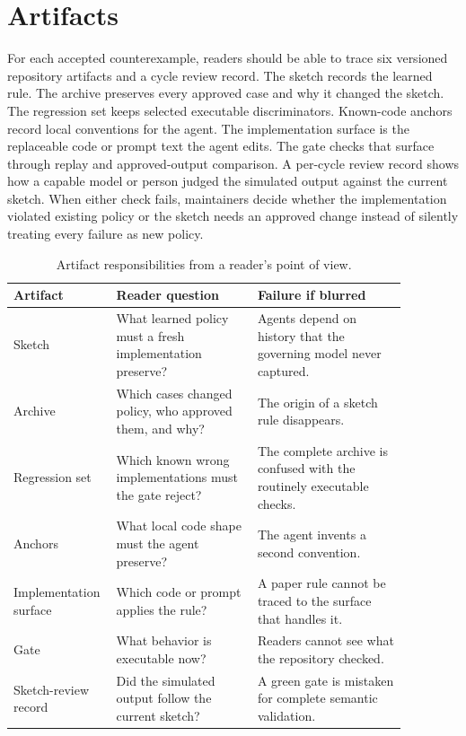 \documentclass[11pt]{article}
\begin{document}
\section{Artifacts}
\label{sec:artifacts}

For each accepted counterexample, readers should be able to trace six versioned repository
artifacts and a cycle review record.  The sketch records the learned rule.  The archive preserves every approved case and why it changed
the sketch.  The regression set keeps selected executable discriminators.  Known-code anchors
record local conventions for the agent.  The implementation surface is the replaceable code or
prompt text the agent edits.  The gate checks that surface through replay and approved-output
comparison.  A per-cycle review record shows how a capable model or person judged the simulated
output against the current sketch.
When either check fails, maintainers decide whether the implementation violated existing policy
or the sketch needs an approved change instead of silently treating every failure as new policy.

\begin{table}[t]
\begin{center}
\small
\begin{tabular}{p{0.17\linewidth}p{0.34\linewidth}p{0.36\linewidth}}
\toprule
Artifact & Reader question & Failure if blurred \\
\midrule
Sketch & What learned policy must a fresh implementation preserve? & Agents depend on history that the governing model never captured. \\
Archive & Which cases changed policy, who approved them, and why? & The origin of a sketch rule disappears. \\
Regression set & Which known wrong implementations must the gate reject? & The complete archive is confused with the routinely executable checks. \\
Anchors & What local code shape must the agent preserve? & The agent invents a second convention. \\
Implementation surface & Which code or prompt applies the rule? & A paper rule cannot be traced to the surface that handles it. \\
Gate & What behavior is executable now? & Readers cannot see what the repository checked. \\
Sketch-review record & Did the simulated output follow the current sketch? & A green gate is mistaken for complete semantic validation. \\
\bottomrule
\end{tabular}
\end{center}
\caption{Artifact responsibilities from a reader's point of view.}
\label{tab:artifact-map}
\end{table}
\end{document}
